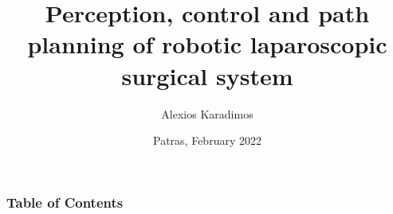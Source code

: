 \documentclass{beamer}
\title[]{Perception, control and path planning of robotic laparoscopic surgical system}
\author{Alexios Karadimos}
\institute[ECE U. Patras]{Deparment of Electrical and Computer Engineering}
\date{Patras, February 2022}
\begin{document}


\frame{\titlepage}

\begin{frame}
\frametitle{Table of Contents}
\tableofcontents
\end{frame}











\end{document}
